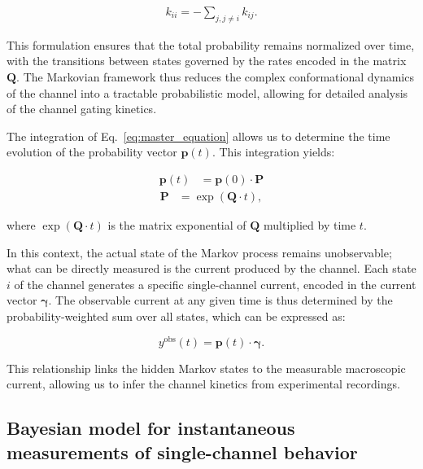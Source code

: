\documentclass[pdflatex,sn-mathphys-num]{sn-jnl}%
\theoremstyle{thmstyleone}%
\theoremstyle{thmstyletwo}%
\theoremstyle{thmstylethree}%
\begin{document}
\begin{align}
	k_{ii} = -\sum_{j, j \neq i} k_{ij}.
	\label{eq:Q_diagonal_element}
\end{align}

This formulation ensures that the total probability remains normalized over time, with the transitions between states governed by the rates encoded in the matrix \( \boldsymbol{Q} \). The Markovian framework thus reduces the complex conformational dynamics of the channel into a tractable probabilistic model, allowing for detailed analysis of the channel gating kinetics.


The integration of Eq.~\ref{eq:master_equation} allows us to determine the time evolution of the probability vector \( \boldsymbol{p}(t) \). This integration yields:


\begin{align}
	\boldsymbol{p}(t) &= \boldsymbol{p}(0) \cdot \boldsymbol{P}
	\label{eq:master_equation_solution}
\end{align}
\begin{align}
	\boldsymbol{P} &= \exp(\boldsymbol{Q} \cdot t),
	\label{eq:Transition_Matrix_definition}
\end{align}


where \( \exp(\boldsymbol{Q} \cdot t) \) is the matrix exponential of \( \boldsymbol{Q} \) multiplied by time \( t \). 

In this context, the actual state of the Markov process remains unobservable; what can be directly measured is the current produced by the channel. Each state \( i \) of the channel generates a specific single-channel current, encoded in the current vector \( \boldsymbol{\gamma} \). The observable current at any given time is thus determined by the probability-weighted sum over all states, which can be expressed as:

\begin{equation}
	y^{\text{obs}}(t) = \boldsymbol{p}(t) \cdot \boldsymbol{\gamma}.
	\label{eq:single_channel_current}
\end{equation}

This relationship links the hidden Markov states to the measurable macroscopic current, allowing us to infer the channel kinetics from experimental recordings.



\subsection{Bayesian model for instantaneous measurements of single-channel behavior}
\end{document}
